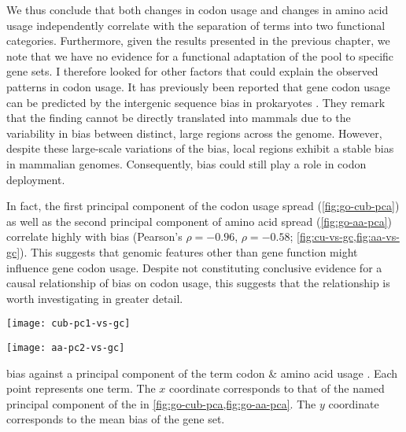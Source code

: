 We thus conclude that both changes in codon usage and changes in amino acid
usage independently correlate with the separation of \go terms into two
functional categories. Furthermore, given the results presented in the previous
chapter, we note that we have no evidence for a functional adaptation of the
\trna pool to specific gene sets. I therefore looked for other factors that
could explain the observed patterns in codon usage. It has previously been
reported that gene codon usage can be predicted by the intergenic sequence \gc
bias in prokaryotes \citep{Chen:2004}. They remark that the finding cannot be
directly translated into mammals due to the variability in \gc bias between
distinct, large regions across the genome. However, despite these large-scale
variations of the \gc bias, local regions exhibit a stable \gc bias in mammalian
genomes. Consequently, \gc bias could still play a role in codon deployment.

In fact, the first principal component of the codon usage spread
(\cref{fig:go-cub-pca}) as well as the second principal component of amino acid
spread (\cref{fig:go-aa-pca}) correlate highly with \gc bias (Pearson’s \(\rho =
-0.96\), \(\rho = -0.58\); \cref{fig:cu-vs-gc,fig:aa-vs-gc}). This suggests that
genomic features other than gene function might influence gene codon usage.
Despite not constituting conclusive evidence for a causal relationship of \gc
bias on codon usage, this suggests that the relationship is worth investigating
in greater detail.

    {%
        \begin{minipage}{0.5\textwidth}
            \texttt{[image: cub-pc1-vs-gc]}%
        \end{minipage}%
        \begin{minipage}{0.5\textwidth}
            \texttt{[image: aa-pc2-vs-gc]}%
        \end{minipage}%
    }
    {\gc bias against a principal component of the \go term codon \& amino acid
    usage \pca.}
    {Each point represents one \go term. The \(x\) coordinate corresponds to
    that of the named principal component of the \pca in
    \cref{fig:go-cub-pca,fig:go-aa-pca}. The \(y\) coordinate corresponds to
    the mean \gc bias of the \go gene set.}

